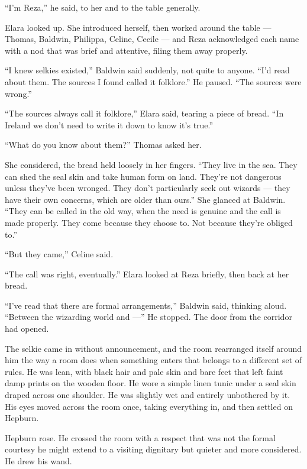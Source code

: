 \enquote{I'm Reza,} he said, to her and to the table generally.

Elara looked up. She introduced herself, then worked around the table --- Thomas, Baldwin, Philippa, Celine, Cecile --- and Reza acknowledged each name with a nod that was brief and attentive, filing them away properly.

\enquote{I knew selkies existed,} Baldwin said suddenly, not quite to anyone. \enquote{I'd read about them. The sources I found called it folklore.} He paused. \enquote{The sources were wrong.}

\enquote{The sources always call it folklore,} Elara said, tearing a piece of bread. \enquote{In Ireland we don't need to write it down to know it's true.}

\enquote{What do you know about them?} Thomas asked her.

She considered, the bread held loosely in her fingers. \enquote{They live in the sea. They can shed the seal skin and take human form on land. They're not dangerous unless they've been wronged. They don't particularly seek out wizards --- they have their own concerns, which are older than ours.} She glanced at Baldwin. \enquote{They can be called in the old way, when the need is genuine and the call is made properly. They come because they choose to. Not because they're obliged to.}

\enquote{But they came,} Celine said.

\enquote{The call was right, eventually.} Elara looked at Reza briefly, then back at her bread.

\enquote{I've read that there are formal arrangements,} Baldwin said, thinking aloud. \enquote{Between the wizarding world and ---} He stopped. The door from the corridor had opened.

The selkie came in without announcement, and the room rearranged itself around him the way a room does when something enters that belongs to a different set of rules. He was lean, with black hair and pale skin and bare feet that left faint damp prints on the wooden floor. He wore a simple linen tunic under a seal skin draped across one shoulder. He was slightly wet and entirely unbothered by it. His eyes moved across the room once, taking everything in, and then settled on Hepburn.

Hepburn rose. He crossed the room with a respect that was not the formal courtesy he might extend to a visiting dignitary but quieter and more considered. He drew his wand.


